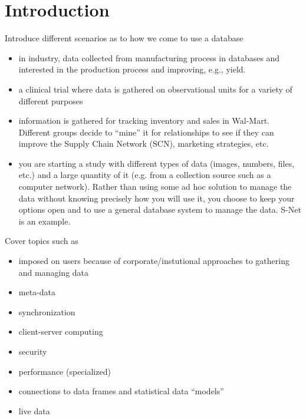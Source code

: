 \documentclass[11pt,timesroman]{article}
\begin{document}
\baselineskip=18pt


\section{Introduction}
Introduce different scenarios  as to how we come to use a database
\begin{itemize}
\item in industry, data collected from manufacturing process in
  databases and interested in the production process and improving,
  e.g., yield.
\item a clinical trial where data is gathered on observational units 
  for a variety of different purposes
\item information is gathered for tracking inventory and sales in
  Wal-Mart.  Different groups decide to ``mine'' it for 
 relationships to see if they can improve the Supply Chain Network
  (SCN), marketing strategies, etc.

\item you are starting a study   with different types of data (images,
 numbers, files, etc.) and a
 large quantity of it (e.g. from a collection source such as a
 computer network).  Rather than using some ad hoc solution to manage
 the data without knowing precisely how you will use it, you choose to 
 keep your options open and to use a general database system to manage
 the data.  S-Net is an example.
\end{itemize}


Cover topics such as 
\begin{itemize}
\item imposed on users because of corporate/instutional approaches to
  gathering and managing data 
\item meta-data
\item synchronization
\item client-server computing
\item security
\item performance (specialized)
\item  connections to data frames and statistical data ``models''
\item live data
\end{itemize}
\end{document}

